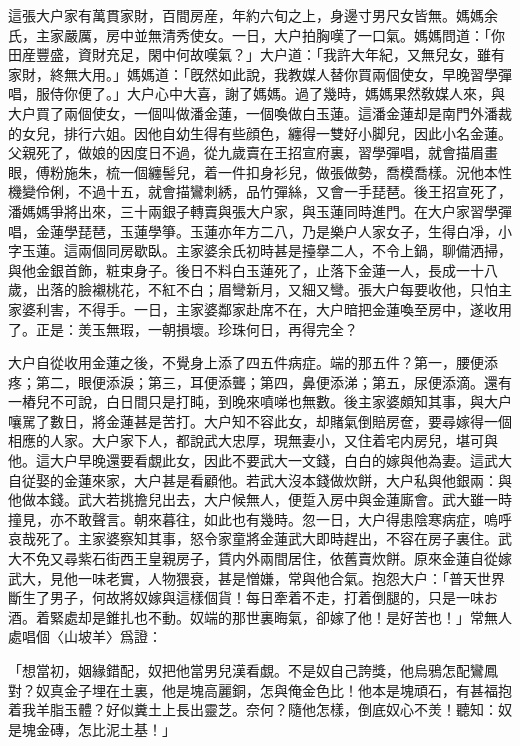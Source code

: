 這張大户家有萬貫家財，百間房産，年約六旬之上，身邊寸男尺女皆無。媽媽余氏，主家嚴厲，房中並無清秀使女。一日，大户拍胸嘆了一口氣。媽媽問道：「你田産豐盛，資財充足，閑中何故嘆氣？」大户道：「我許大年紀，又無兒女，雖有家財，終無大用。」媽媽道：「旣然如此說，我教媒人替你買兩個使女，早晚習學彈唱，服侍你便了。」大户心中大喜，謝了媽媽。過了幾時，媽媽果然敎媒人來，與大户買了兩個使女，一個叫做潘金蓮，一個喚做白玉蓮。這潘金蓮却是南門外潘裁的女兒，排行六姐。因他自幼生得有些顔色，纏得一雙好小脚兒，因此小名金蓮。父親死了，做娘的因度日不過，從九歲賣在王招宣府裏，習學彈唱，就會描眉畫眼，傅粉施朱，梳一個纏髻兒，着一件扣身衫兒，做張做勢，喬模喬樣。況他本性機變伶俐，不過十五，就會描鸞刺綉，品竹彈絲，又會一手琵琶。後王招宣死了，潘媽媽爭將出來，三十兩銀子轉賣與張大户家，與玉蓮同時進門。在大户家習學彈唱，金蓮學琵琶，玉蓮學箏。玉蓮亦年方二八，乃是樂户人家女子，生得白凈，小字玉蓮。這兩個同房歇臥。主家婆余氏初時甚是擡擧二人，不令上鍋，聊備洒掃，與他金銀首飾，粧束身子。後日不料白玉蓮死了，止落下金蓮一人，長成一十八歲，出落的臉襯桃花，不紅不白；眉彎新月，又細又彎。張大户每要收他，只怕主家婆利害，不得手。一日，主家婆鄰家赴席不在，大户暗把金蓮喚至房中，遂收用了。正是：羙玉無瑕，一朝損壞。珍珠何日，再得完全？

大户自從收用金蓮之後，不覺身上添了四五件病症。端的那五件？第一，腰便添疼；第二，眼便添淚；第三，耳便添聾；第四，鼻便添涕；第五，尿便添滴。還有一樁兒不可說，白日間只是打盹，到晚來噴㖒也無數。後主家婆頗知其事，與大户嚷駡了數日，將金蓮甚是苦打。大户知不容此女，却賭氣倒賠房奩，要尋嫁得一個相應的人家。大户家下人，都說武大忠厚，現無妻小，又住着宅内房兒，堪可與他。這大户早晚還要看覷此女，因此不要武大一文錢，白白的嫁與他為妻。這武大自従娶的金蓮來家，大户甚是看顧他。若武大沒本錢做炊餅，大户私與他銀兩：與他做本錢。武大若挑擔兒出去，大户候無人，便踅入房中與金蓮廝會。武大雖一時撞見，亦不敢聲言。朝來暮往，如此也有幾時。忽一日，大户得患陰寒病症，嗚呼哀哉死了。主家婆察知其事，怒令家童將金蓮武大即時趕出，不容在房子裏住。武大不免又尋紫石街西王皇親房子，賃内外兩間居住，依舊賣炊餅。原來金蓮自從嫁武大，見他一味老實，人物猥衰，甚是憎嫌，常與他合氣。抱怨大户：「普天世界斷生了男子，何故將奴嫁與這樣個貨！每日牽着不走，打着倒腿的，只是一味お酒。着緊處却是錐扎也不動。奴端的那世裏晦氣，卻嫁了他！是好苦也！」常無人處唱個〈山坡羊〉爲證：

\begin{myquote}
「想當初，姻緣錯配，奴把他當男兒漢看覷。不是奴自己誇獎，他烏鴉怎配鸞鳳對？奴真金子埋在土裏，他是塊高麗銅，怎與俺金色比！他本是塊頑石，有甚福抱着我羊脂玉體？好似糞土上長出靈芝。奈何？隨他怎樣，倒底奴心不羙！聽知：奴是塊金磚，怎比泥土基！」
\end{myquote}

